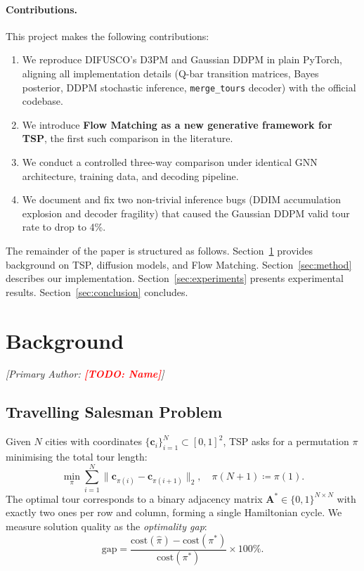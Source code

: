\documentclass[11pt,a4paper]{article}
\newcommand{\TODO}[1]{\textcolor{red}{\textbf{[TODO: #1]}}}
\begin{document}
\paragraph{Contributions.}
This project makes the following contributions:
\begin{enumerate}
  \item We reproduce DIFUSCO's D3PM and Gaussian DDPM in plain PyTorch, aligning all
        implementation details (Q-bar transition matrices, Bayes posterior, DDPM stochastic
        inference, \texttt{merge\_tours} decoder) with the official codebase.
  \item We introduce \textbf{Flow Matching as a new generative framework for TSP}, the first
        such comparison in the literature.
  \item We conduct a controlled three-way comparison under identical GNN architecture,
        training data, and decoding pipeline.
  \item We document and fix two non-trivial inference bugs (DDIM accumulation explosion and
        decoder fragility) that caused the Gaussian DDPM valid tour rate to drop to 4\%.
\end{enumerate}

The remainder of the paper is structured as follows. Section~\ref{sec:background} provides
background on TSP, diffusion models, and Flow Matching. Section~\ref{sec:method} describes
our implementation. Section~\ref{sec:experiments} presents experimental results.
Section~\ref{sec:conclusion} concludes.


\section{Background}
\label{sec:background}
\textit{[Primary Author: \TODO{Name}]}

\subsection{Travelling Salesman Problem}
Given $N$ cities with coordinates $\{\mathbf{c}_i\}_{i=1}^N \subset [0,1]^2$, TSP asks for
a permutation $\pi$ minimising the total tour length:
\begin{equation}
  \min_\pi \sum_{i=1}^N \|\mathbf{c}_{\pi(i)} - \mathbf{c}_{\pi(i+1)}\|_2,
  \quad \pi(N+1) \coloneqq \pi(1).
  \label{eq:tsp}
\end{equation}
The optimal tour corresponds to a binary adjacency matrix
$\mathbf{A}^* \in \{0,1\}^{N \times N}$ with exactly two ones per row and column, forming a
single Hamiltonian cycle. We measure solution quality as the \emph{optimality gap}:
\begin{equation}
  \text{gap} = \frac{\text{cost}(\hat\pi) - \text{cost}(\pi^*)}{\text{cost}(\pi^*)} \times 100\%.
\end{equation}
\end{document}
